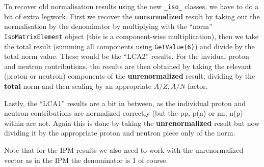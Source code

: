 \documentclass[10pt]{article}
\begin{document}
\begin{itemize}
To recover old normalisation results using the new \texttt{\_iso\_} classes, we have to do a bit of extra legwork.  First we recover the \textbf{unnormalized} result by taking out the normalisation by the denominator by multiplying with the ``norm'' \texttt{IsoMatrixElement} object (this is a component-wise multiplication), then we take the total result (summing all components using \texttt{GetValue(6)}) and divide by the total norm value.  These would be the ``LCA2'' results.  For the invidual proton and neutron contributions, the results are then obtained by taking the relevant (proton or neutron) components of the \textbf{unrenormalized} result, dividing by the \textbf{total} norm and then scaling by an appropriate $A/Z,A/N$ factor.

Lastly, the ``LCA1'' results are a bit in between, as the individual proton and neutron contributions are normalized correctly (but the pp, p(n) or nn, n(p) within are not.  Again this is done by taking the \textbf{unrenormalized} result but now dividing it by the appropriate proton and neutron piece only of the norm.  

Note that for the IPM results we also need to work with the unrenormalized vector as in the IPM the denominator is 1 of course.

\end{itemize}
\end{document}
